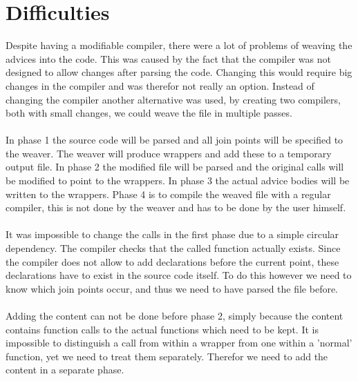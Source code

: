 \documentclass[a4paper]{report}
\begin{document}
\section{Difficulties}
Despite having a modifiable compiler, there were a lot of problems of weaving the advices into the code. This was caused by the fact that the compiler was not designed to allow changes after parsing the code. Changing this would require big changes in the compiler and was therefor not really an option. Instead of changing the compiler another alternative was used, by creating two compilers, both with small changes, we could weave the file in multiple passes.\\
\\
In phase 1 the source code will be parsed and all join points will be specified to the weaver. The weaver will produce wrappers and add these to a temporary output file. In phase 2 the modified file will be parsed and the original calls will be modified to point to the wrappers. In phase 3 the actual advice bodies will be written to the wrappers. Phase 4 is to compile the weaved file with a regular compiler, this is not done by the weaver and has to be done by the user himself.\\
\\
It was impossible to change the calls in the first phase due to a simple circular dependency. The compiler checks that the called function actually exists. Since the compiler does not allow to add declarations before the current point, these declarations have to exist in the source code itself. To do this however we need to know which join points occur, and thus we need to have parsed the file before.\\
\\
Adding the content can not be done before phase 2, simply because the content contains function calls to the actual functions which need to be kept. It is impossible to distinguish a call from within a wrapper from one within a 'normal' function, yet we need to treat them separately. Therefor we need to add the content in a separate phase.
\end{document}

